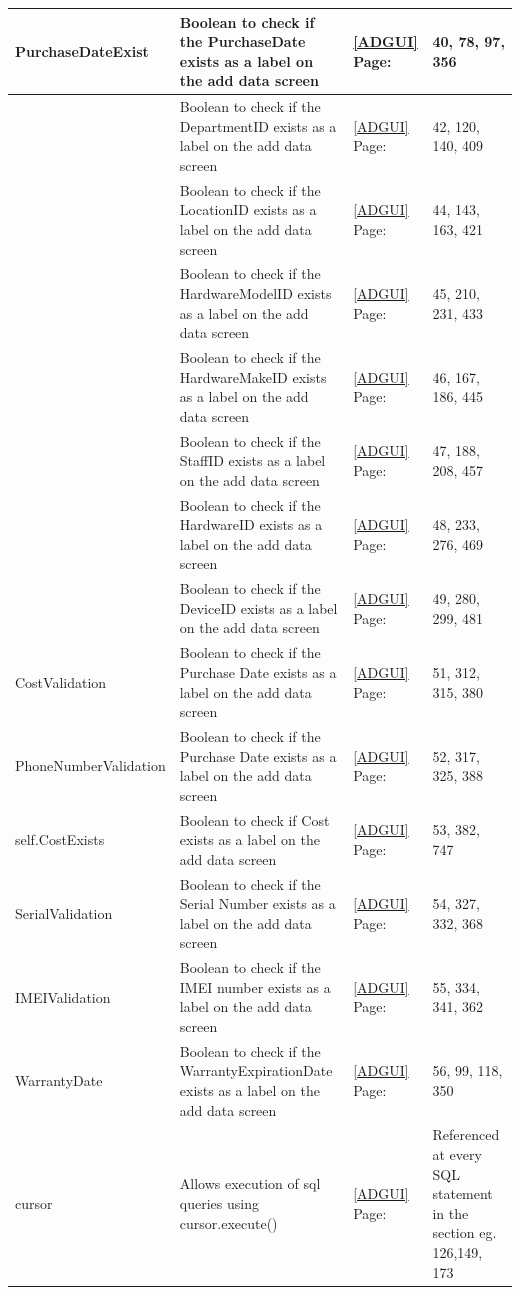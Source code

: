 \begin{center}
\begin{longtable}{|p{4cm}|p{3cm}|p{2cm}|p{3cm}|}
PurchaseDateExist & Boolean to check if the PurchaseDate exists as a label on the add data screen  & \ref{ADGUI} Page: \pageref{ADGUI} & 40, 78, 97, 356  \\ \hline
\verb DepartmentID_CB & Boolean to check if the DepartmentID exists as a label on the add data screen  & \ref{ADGUI} Page: \pageref{ADGUI} &42, 120, 140, 409  \\ \hline
\verb LocationID_CB & Boolean to check if the LocationID exists as a label on the add data screen  & \ref{ADGUI} Page: \pageref{ADGUI}  &44, 143, 163, 421 \\ \hline
\verb HardwareModelID_CB & Boolean to check if the HardwareModelID exists as a label on the add data screen & \ref{ADGUI} Page: \pageref{ADGUI} &45, 210, 231, 433   \\ \hline
\verb HardwareMakeID_CB & Boolean to check if the HardwareMakeID exists as a label on the add data screen  & \ref{ADGUI} Page: \pageref{ADGUI} & 46, 167, 186, 445    \\ \hline
\verb StaffID_CB & Boolean to check if the StaffID exists as a label on the add data screen & \ref{ADGUI} Page: \pageref{ADGUI} & 47, 188, 208, 457  \\ \hline
\verb HardwareID_CB & Boolean to check if the HardwareID exists as a label on the add data screen  & \ref{ADGUI} Page: \pageref{ADGUI}  & 48, 233, 276, 469 \\ \hline
\verb DeviceID_CB & Boolean to check if the DeviceID exists as a label on the add data screen & \ref{ADGUI} Page: \pageref{ADGUI} & 49, 280, 299, 481   \\ \hline
CostValidation & Boolean to check if the Purchase Date exists as a label on the add data screen & \ref{ADGUI} Page: \pageref{ADGUI} &51, 312, 315, 380 \\ \hline
PhoneNumberValidation & Boolean to check if the Purchase Date exists as a label on the add data screen & \ref{ADGUI} Page: \pageref{ADGUI} & 52, 317, 325, 388 \\ \hline
self.CostExists & Boolean to check if Cost exists as a label on the add data screen  & \ref{ADGUI} Page: \pageref{ADGUI} & 53, 382, 747  \\ \hline
SerialValidation & Boolean to check if the Serial Number exists as a label on the add data screen  & \ref{ADGUI} Page: \pageref{ADGUI}  &54, 327, 332, 368  \\ \hline
IMEIValidation & Boolean to check if the IMEI number exists as a label on the add data screen  & \ref{ADGUI} Page: \pageref{ADGUI} &55, 334, 341, 362 \\ \hline
WarrantyDate &  Boolean to check if the WarrantyExpirationDate exists as a label on the add data screen & \ref{ADGUI} Page: \pageref{ADGUI} &56, 99, 118, 350  \\ \hline
cursor & Allows execution of sql queries using cursor.execute()& \ref{ADGUI} Page: \pageref{ADGUI} & Referenced at every SQL statement in the section eg. 126,149, 173  \\ \hline


\end{longtable}
\end{center}
